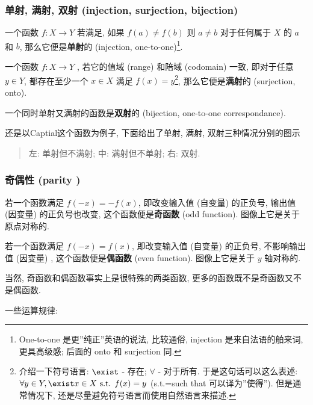 \hypertarget{ux5355ux5c04-ux6ee1ux5c04-ux53ccux5c04-injection-surjection-bijection}{%
\subsubsection{单射, 满射, 双射 (injection, surjection,
bijection)}\label{ux5355ux5c04-ux6ee1ux5c04-ux53ccux5c04-injection-surjection-bijection}}

一个函数 \(f:X\rightarrow Y\) 若满足, 如果 \(f(a)\neq f(b)\) 则
\(a\neq b\) 对于任何属于 \(X\) 的 \(a\) 和 \(b\),
那么它便是\textbf{单射}的 (injection, one-to-one)\footnote{One-to-one
  是更''纯正''英语的说法, 比较通俗, injection 是来自法语的舶来词,
  更具高级感; 后面的 onto 和 surjection 同.}.

一个函数 \(f:X\rightarrow Y\) , 若它的值域 (range) 和陪域 (codomain)
一致, 即对于任意 \(y\in Y\), 都存在至少一个 \(x\in X\) 满足
\(f(x)=y\)\footnote{介绍一下符号语言: \(\exist\) - 存在; \(\forall\) -
  对于所有. 于是这句话可以这么表述:
  \(\forall y\in Y, \exist x\in X \text{ s.t. } f(x)=y\) (s.t.=such that
  可以译为''使得''). 但是通常情况下,
  还是尽量避免符号语言而使用自然语言来描述.}, 那么它便是\textbf{满射}的
(surjection, onto).

一个同时单射又满射的函数是\textbf{双射}的 (bijection, one-to-one
correspondance).

还是以Captial这个函数为例子, 下面给出了单射, 满射,
双射三种情况分别的图示

\begin{quote}
左: 单射但不满射; 中: 满射但不单射; 右: 双射.
\end{quote}

\hypertarget{ux5947ux5076ux6027-parity}{%
\subsubsection{\texorpdfstring{奇偶性 (parity
\doge)}{奇偶性 (parity )}}\label{ux5947ux5076ux6027-parity}}

若一个函数满足 \(f(-x)=-f(x)\), 即改变输入值 (自变量) 的正负号, 输出值
(因变量) 的正负号也改变, 这个函数便是\textbf{奇函数} (odd function).
图像上它是关于原点对称的.

若一个函数满足 \(f(-x)=f(x)\), 即改变输入值 (自变量) 的正负号,
不影响输出值 (因变量) , 这个函数便是\textbf{偶函数} (even function).
图像上它是关于 \(y\) 轴对称的.

当然, 奇函数和偶函数事实上是很特殊的两类函数,
更多的函数既不是奇函数又不是偶函数.

一些运算规律:

